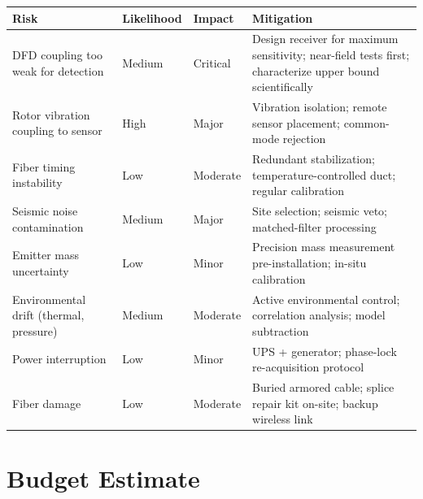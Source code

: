 \documentclass[11pt,a4paper]{article}
\begin{document}
\begin{longtable}{p{3.5cm}p{2cm}p{2cm}p{5.5cm}}
\toprule
\textbf{Risk} & \textbf{Likelihood} & \textbf{Impact} & \textbf{Mitigation} \\
\midrule
\endfirsthead
DFD coupling too weak for detection & Medium & Critical &
Design receiver for maximum sensitivity; near-field tests first; characterize upper bound scientifically \\
\addlinespace
Rotor vibration coupling to sensor & High & Major &
Vibration isolation; remote sensor placement; common-mode rejection \\
\addlinespace
Fiber timing instability & Low & Moderate &
Redundant stabilization; temperature-controlled duct; regular calibration \\
\addlinespace
Seismic noise contamination & Medium & Major &
Site selection; seismic veto; matched-filter processing \\
\addlinespace
Emitter mass uncertainty & Low & Minor &
Precision mass measurement pre-installation; in-situ calibration \\
\addlinespace
Environmental drift (thermal, pressure) & Medium & Moderate &
Active environmental control; correlation analysis; model subtraction \\
\addlinespace
Power interruption & Low & Minor &
UPS + generator; phase-lock re-acquisition protocol \\
\addlinespace
Fiber damage & Low & Moderate &
Buried armored cable; splice repair kit on-site; backup wireless link \\
\bottomrule
\end{longtable}

\section{Budget Estimate}
\end{document}

